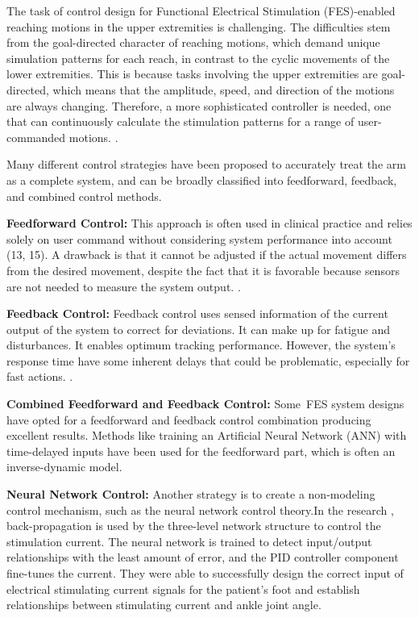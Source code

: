 The task of control design for Functional Electrical Stimulation (FES)-enabled reaching motions in the upper extremities is challenging. The difficulties stem from the goal-directed character of reaching motions, which demand unique simulation patterns for each reach, in contrast to the cyclic movements of the lower extremities. This is because tasks involving the upper extremities are goal-directed, which means that the amplitude, speed, and direction of the motions are always changing. Therefore, a more sophisticated controller is needed, one that can continuously calculate the stimulation patterns for a range of user-commanded motions. \cite{CFF}.

Many different control strategies have been proposed to accurately treat the arm as a complete system, and can be broadly classified into feedforward, feedback, and combined control methods.

\textbf{Feedforward Control:} This approach is often used in clinical practice and relies solely on user command without considering system performance into account (13, 15). A drawback is that it cannot be adjusted if the actual movement differs from the desired movement, despite the fact that it is favorable because sensors are not needed to measure the system output.  \cite{CFF}.

\textbf{Feedback Control:} Feedback control uses sensed information of the current output of the system to correct for deviations. It can make up for fatigue and disturbances. It enables optimum tracking performance. However, the system's response time have some inherent delays that could be problematic, especially for fast actions. \cite{CFF}.

\textbf{Combined Feedforward and Feedback Control:} Some FES system designs have opted for a feedforward and feedback control combination producing excellent results. Methods like training an Artificial Neural Network (ANN) with time-delayed inputs have been used for the feedforward part, which is often an inverse-dynamic model.

\textbf{Neural Network Control:} Another strategy is to create a non-modeling control mechanism, such as the neural network control theory.In the research \cite{NNPID}, back-propagation is used by the three-level network structure to control the stimulation current. The neural network is trained to detect input/output relationships with the least amount of error, and the PID controller component fine-tunes the current. They were able to successfully design the correct input of electrical stimulating current signals for the patient's foot and establish relationships between stimulating current and ankle joint angle.

